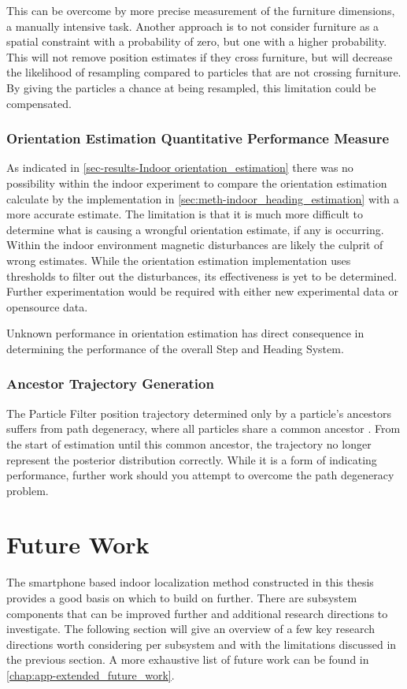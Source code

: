 This can be overcome by more precise measurement of the furniture dimensions, a manually intensive task. Another approach is to not consider furniture as a spatial constraint with a probability of zero, but one with a higher probability. This will not remove position estimates if they cross furniture, but will decrease the likelihood of resampling compared to particles that are not crossing furniture. By giving the particles a chance at being resampled, this limitation could be compensated.

\subsubsection{ Orientation Estimation Quantitative Performance Measure}

As indicated in \cref{sec-results-Indoor orientation_estimation} there was no possibility within the indoor experiment to compare the orientation estimation calculate by the implementation in \cref{sec:meth-indoor_heading_estimation} with a more accurate estimate. The limitation is that it is much more difficult to determine what is causing a wrongful orientation estimate, if any is occurring. 
Within the indoor environment magnetic disturbances are likely the culprit of wrong estimates. While the orientation estimation implementation uses thresholds to filter out the disturbances, its effectiveness is yet to be determined. Further experimentation would be required with either new experimental data or opensource data.

Unknown performance in orientation estimation has direct consequence in determining the performance of the overall Step and Heading System. 

\subsubsection{Ancestor Trajectory Generation}
The Particle Filter position trajectory determined  only by a particle's ancestors suffers from path degeneracy, where all particles share a common ancestor \cite{Lindsten2013}. From the start of estimation until this common ancestor, the trajectory no longer represent the posterior distribution correctly. While it is a form of indicating performance, further work should you attempt to overcome the path degeneracy problem.

\section{Future Work}
\label{sec:conclusion-future_work}
The smartphone based indoor localization method constructed in this thesis provides a good basis on which to build on further. There are subsystem components that can be improved further and additional research directions to investigate. The following section will give an overview of a few key research directions worth considering per subsystem and with the limitations discussed in the previous section. A more exhaustive list of future work can be found in \cref{chap:app-extended_future_work}. 

